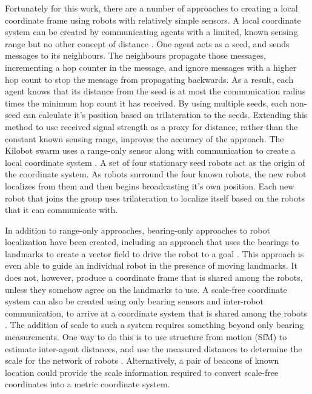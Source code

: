 Fortunately for this work, there are a number of approaches to creating a local coordinate frame using robots with relatively simple sensors. 
A local coordinate system can be created by communicating agents with a limited, known sensing range but no other concept of distance \citep{bachrach2004experimental}.
One agent acts as a seed, and sends messages to its neighbours.
The neighbours propagate those messages, incrementing a hop counter in the message, and ignore messages with a higher hop count to stop the message from propagating backwards. 
As a result, each agent knows that its distance from the seed is at most the communication radius times the minimum hop count it has received. 
By using multiple seeds, each non-seed can calculate it's position based on trilateration to the seeds. 
Extending this method to use received signal strength as a proxy for distance, rather than the constant known sensing range, improves the accuracy of the approach.  
The Kilobot swarm uses a range-only sensor along with communication to create a local coordinate system \citep{Rubenstein795}.
A set of four stationary seed robots act as the origin of the coordinate system. As robots surround the four known robots, the new robot localizes from them and then begins broadcasting it's own position. 
Each new robot that joins the group uses trilateration to localize itself based on the robots that it can communicate with.

In addition to range-only approaches, bearing-only approaches to robot localization have been created, including an approach that uses the bearings to landmarks to create a vector field to drive the robot to a goal \citep{loizou2007biologically}. 
This approach is even able to guide an individual robot in the presence of moving landmarks. 
It does not, however, produce a coordinate frame that is shared among the robots, unless they somehow agree on the landmarks to use. 
A scale-free coordinate system can also be created using only bearing sensors and inter-robot communication, to arrive at a coordinate system that is shared among the robots \citep{cornejo2013scale}.
The addition of scale to such a system requires something beyond only bearing measurements. 
One way to do this is to use structure from motion (SfM) to estimate inter-agent distances, and use the measured distances to determine the scale for the network of robots \citep{spica2016active}. 
Alternatively, a pair of beacons of known location could provide the scale information required to convert scale-free coordinates into a metric coordinate system. 

